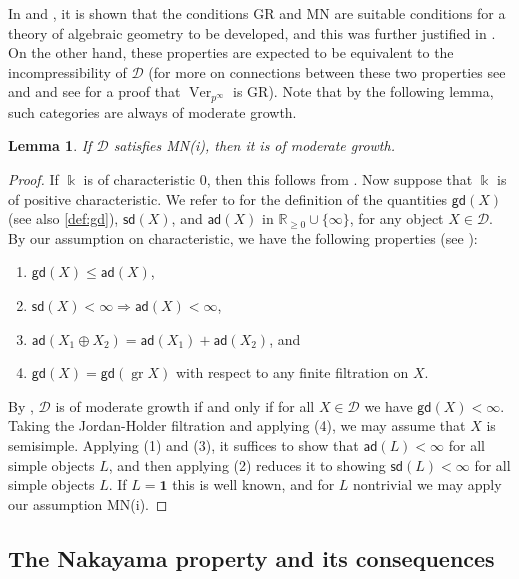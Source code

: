 \documentclass[11pt]{amsart}
\def\ad{\mathsf{ad}}
\def\R{\mathbb{R}}
\def\Ds{\mathscr{D}}
\def\Ver{\operatorname{Ver}}
\def\gr{\operatorname{gr}}
\newtheorem{lemma}[thm]{Lemma}
\theoremstyle{definition}
\theoremstyle{remark}
\numberwithin{equation}{section}
\begin{document}
In \cite{C1} and \cite{C2}, it is shown that the conditions GR and MN are suitable conditions for a theory of algebraic geometry to be developed, and this was further justified in \cite{CS}. On the other hand, these properties are expected to be equivalent to the incompressibility of $\Ds$ (for more on connections between these two properties see \cite{C1} and \cite{CEO} and see \cite{GR} for a proof that $\Ver_{p^\infty}$ is GR).  Note that by the following lemma, such categories are always of moderate growth.

\begin{lemma}
    If $\Ds$ satisfies MN(i), then it is of moderate growth.
\end{lemma}

\begin{proof}
If $\Bbbk$ is of characteristic 0, then this follows from \cite[Prop.~0.5]{Del02}.  Now suppose that $\Bbbk$ is of positive characteristic.  We refer to \cite[Defn.~4.1]{CEO-A} for the definition of the quantities $\mathsf{gd}(X)$ (see also \eqref{def:gd}), $\mathsf{sd}(X)$, and $\mathsf{ad}(X)$ in $\R_{\ge 0}\cup\{\infty\}$, for any object $X\in\Ds$.  By our assumption on characteristic, we have the following properties (see \cite[Prop.~4.7, Lem.~4.9]{CEO-A}):
\begin{enumerate}
    \item $\mathsf{gd}(X)\leq \ad(X)$,
    \item $\mathsf{sd}(X)<\infty\Rightarrow\ad(X)<\infty$,
    \item $\ad(X_1\oplus X_2)=\ad(X_1)+\ad(X_2)$, and
    \item $\mathsf{gd}(X)=\mathsf{gd}(\gr X)$ with respect to any finite filtration on $X$.
\end{enumerate}
    By \cite[Cor.~4.11]{CEO-A}, $\Ds$ is of moderate growth if and only if for all $X\in\Ds$ we have $\mathsf{gd}(X)<\infty$.   Taking the Jordan-Holder filtration and applying (4), we may assume that $X$ is semisimple.  Applying (1) and (3), it suffices to show that $\ad(L)<\infty$ for all simple objects $L$, and then applying (2) reduces it to showing $\mathsf{sd}(L)<\infty$ for all simple objects $L$.  If $L=\mathbf{1}$ this is well known, and for $L$ nontrivial we may apply our assumption MN(i).
\end{proof}  




\subsection{The Nakayama property and its consequences}
\end{document}

